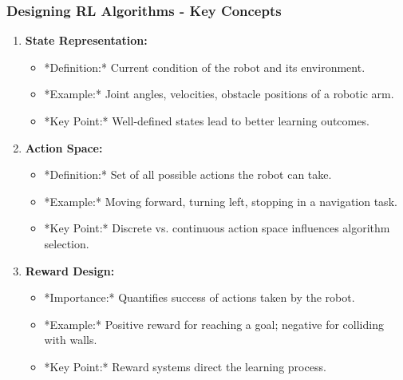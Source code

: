 \documentclass{beamer}
\begin{document}
\begin{frame}[fragile]
    \frametitle{Designing RL Algorithms - Key Concepts}
    \begin{enumerate}
        \item \textbf{State Representation:}
        \begin{itemize}
            \item *Definition:* Current condition of the robot and its environment.
            \item *Example:* Joint angles, velocities, obstacle positions of a robotic arm.
            \item *Key Point:* Well-defined states lead to better learning outcomes.
        \end{itemize}

        \item \textbf{Action Space:}
        \begin{itemize}
            \item *Definition:* Set of all possible actions the robot can take.
            \item *Example:* Moving forward, turning left, stopping in a navigation task.
            \item *Key Point:* Discrete vs. continuous action space influences algorithm selection.
        \end{itemize}

        \item \textbf{Reward Design:}
        \begin{itemize}
            \item *Importance:* Quantifies success of actions taken by the robot.
            \item *Example:* Positive reward for reaching a goal; negative for colliding with walls.
            \item *Key Point:* Reward systems direct the learning process.
        \end{itemize}
    \end{enumerate}
\end{frame}
\end{document}
